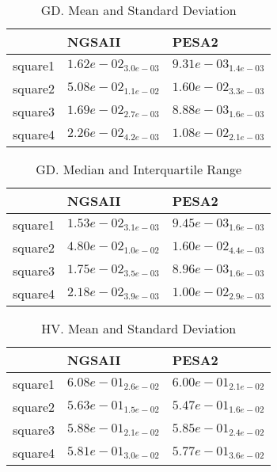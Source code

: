 \documentclass{article}
\begin{document}
\begin{table}
\caption{GD. Mean and Standard Deviation}
\label{table: GD}
\centering
\begin{scriptsize}
\begin{tabular}{lll}
\hline & NGSAII &  PESA2\\
\hline 
square1 & \cellcolor{gray25}$  1.62e-02_{ 3.0e-03}$ & \cellcolor{gray95}$  9.31e-03_{ 1.4e-03}$ \\
square2 & \cellcolor{gray25}$  5.08e-02_{ 1.1e-02}$ & \cellcolor{gray95}$  1.60e-02_{ 3.3e-03}$ \\
square3 & \cellcolor{gray25}$  1.69e-02_{ 2.7e-03}$ & \cellcolor{gray95}$  8.88e-03_{ 1.6e-03}$ \\
square4 & \cellcolor{gray25}$  2.26e-02_{ 4.2e-03}$ & \cellcolor{gray95}$  1.08e-02_{ 2.1e-03}$ \\
\hline
\end{tabular}
\end{scriptsize}
\end{table}

\begin{table}
\caption{GD. Median and Interquartile Range}
\label{table: GD}
\centering
\begin{scriptsize}
\begin{tabular}{lll}
\hline & NGSAII &  PESA2\\
\hline 
square1 & \cellcolor{gray25}$  1.53e-02_{ 3.1e-03}$ & \cellcolor{gray95}$  9.45e-03_{ 1.6e-03}$ \\
square2 & \cellcolor{gray25}$  4.80e-02_{ 1.0e-02}$ & \cellcolor{gray95}$  1.60e-02_{ 4.4e-03}$ \\
square3 & \cellcolor{gray25}$  1.75e-02_{ 3.5e-03}$ & \cellcolor{gray95}$  8.96e-03_{ 1.6e-03}$ \\
square4 & \cellcolor{gray25}$  2.18e-02_{ 3.9e-03}$ & \cellcolor{gray95}$  1.00e-02_{ 2.9e-03}$ \\
\hline
\end{tabular}
\end{scriptsize}
\end{table}

\begin{table}
\caption{HV. Mean and Standard Deviation}
\label{table: HV}
\centering
\begin{scriptsize}
\begin{tabular}{lll}
\hline & NGSAII &  PESA2\\
\hline 
square1 & \cellcolor{gray95}$  6.08e-01_{ 2.6e-02}$ & \cellcolor{gray25}$  6.00e-01_{ 2.1e-02}$ \\
square2 & \cellcolor{gray95}$  5.63e-01_{ 1.5e-02}$ & \cellcolor{gray25}$  5.47e-01_{ 1.6e-02}$ \\
square3 & \cellcolor{gray95}$  5.88e-01_{ 2.1e-02}$ & \cellcolor{gray25}$  5.85e-01_{ 2.4e-02}$ \\
square4 & \cellcolor{gray95}$  5.81e-01_{ 3.0e-02}$ & \cellcolor{gray25}$  5.77e-01_{ 3.6e-02}$ \\
\hline
\end{tabular}
\end{scriptsize}
\end{table}
\end{document}
